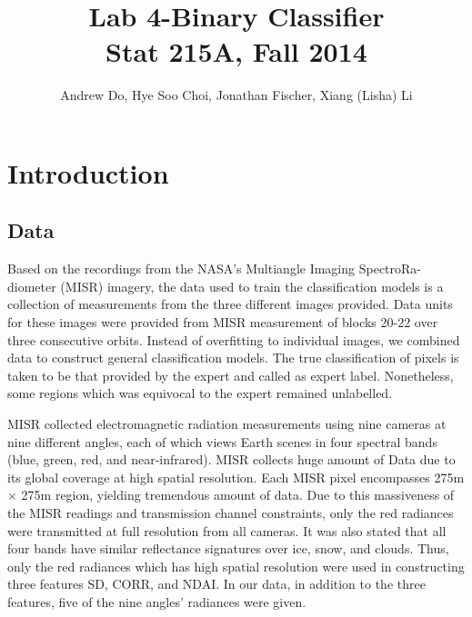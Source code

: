 \documentclass{article}\usepackage[]{graphicx}\usepackage[]{color}
\begin{document}
\title{Lab 4-Binary Classifier\\
Stat 215A, Fall 2014}

\author{Andrew Do, Hye Soo Choi, Jonathan Fischer, Xiang (Lisha) Li }

\maketitle
\section{Introduction}
\subsection{Data} Based on the recordings from the NASA's Multiangle Imaging SpectroRa-diometer (MISR) imagery, the data used to train the classification models is a collection of measurements from the three different images provided. Data units for these images were provided from MISR measurement of blocks 20-22 over three consecutive orbits. Instead of overfitting to individual images, we combined data to construct general classification models. The true classification of pixels is taken to be that provided by the expert and called as expert label. Nonetheless, some regions which was equivocal to the expert remained unlabelled.


MISR collected electromagnetic radiation measurements using nine cameras at nine different angles, each of which views Earth scenes in four spectral bands (blue, green, red, and near-infrared).  MISR collects huge amount of Data due to its global coverage at high spatial resolution. Each MISR pixel encompasses 275m$\times$ 275m region, yielding tremendous amount of data. Due to this massiveness of the MISR readings and transmission channel constraints, only the red radiances were transmitted at full resolution from all cameras. It was also stated that all four bands have similar reflectance signatures over ice, snow, and clouds. Thus, only the red radiances which has high spatial resolution were used in constructing three features SD, CORR, and NDAI.  In our data, in addition to the three features, five of the nine angles' radiances were given.
\end{document}
